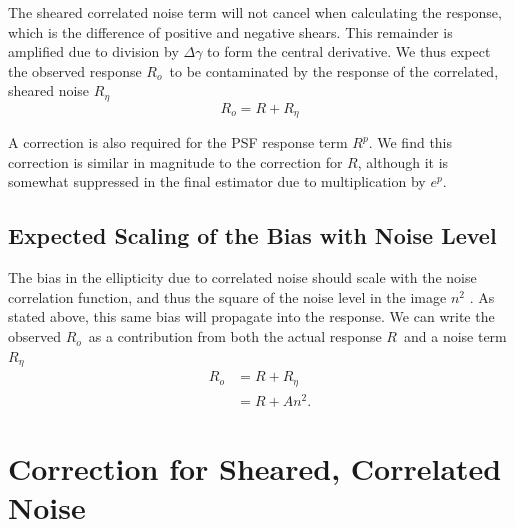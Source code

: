\documentclass[usegraphicx,usenatbib]{mn2e}
\newcommand{\mcalR}{$R$}
\newcommand{\mcalRpsf}{$R^{p}$}
\newcommand{\mcalRo}{$R_o$}
\newcommand{\mcalRnoise}{$R_\eta$}
\begin{document}

The sheared correlated noise term will not cancel when calculating the
response, which is the difference of positive and negative shears.  This
remainder is amplified due to division by $\Delta \gamma$ to form the central
derivative.  We thus expect the observed response \mcalRo\ to be contaminated
by the response of the correlated, sheared noise \mcalRnoise\
\begin{equation}
    \mbox{\mcalRo}  =  R + \mbox{\mcalRnoise}
\end{equation}

A correction is also required for the PSF response term \mcalRpsf.  We find
this correction is similar in magnitude to the correction for \mcalR, although
it is somewhat suppressed in the final estimator due to multiplication by $e^p$.

\subsection{Expected Scaling of the Bias with Noise Level} \label{sec:scaling}

The bias in the ellipticity due to correlated noise should scale
with the noise correlation function, and thus the square of the noise level in
the image $n^2$ \citep{HirataCorrNoise}.  As stated above, this same bias will
propagate into the response.  We can write the observed \mcalRo\ as a contribution
from both the actual response \mcalR\ and a noise term \mcalRnoise\
\begin{align} \label{eq:scaling}
    \mbox{\mcalRo} &= R + \mbox{\mcalRnoise}  \nonumber \\
                   &= R + A n^2.
\end{align}

\section{Correction for Sheared, Correlated Noise} \label{sec:corr}

\end{document}
